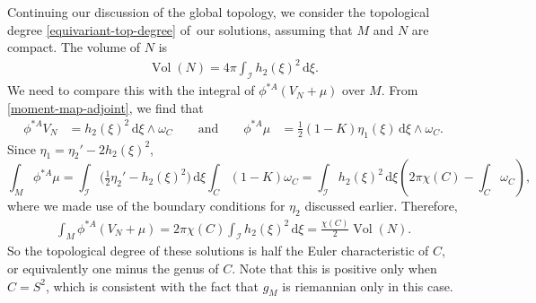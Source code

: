 \documentclass[pdftex]{sigma}
\newcommand{\II}{{\mathcal{I}}}
\newcommand{\1}{{\mathbb{1}}}
\def \d{\mathrm{d}}
\numberwithin{equation}{section}
\begin{document}
Continuing our discussion of the global topology, we consider the topological degree \eqref{equivariant-top-degree} of~our solutions, assuming that $M$ and $N$ are compact. The volume of $N$ is
\begin{align*}
\operatorname{Vol}(N)=4\pi\int_\II h_2(\xi)^2\,\d\xi.
\end{align*}
We need to compare this with the integral of $\phi^{\ast A}(V_N+\mu)$ over $M$. From \eqref{moment-map-adjoint}, we find that
\begin{equation*}
\begin{aligned}
\phi^{\ast A}V_N &= h_2(\xi)^2\,\d\xi\wedge\omega_C \qquad\text{and}\qquad
\phi^{\ast A}\mu &= \tfrac{1}{2}(1-K)\eta_1(\xi)\,\d\xi\wedge\omega_C.
\end{aligned}
\end{equation*}
Since $\eta_1=\eta_2'-2h_2(\xi)^2$,
\begin{equation*}
\int_M \phi^{\ast A}\mu = \int_\II \bigl(\tfrac12\eta_2'-h_2(\xi)^2\bigr)\,\d\xi\int_C(1-K)\omega_C= \int_\II h_2(\xi)^2 \,\d\xi\left(2\pi\chi(C)-\int_C\omega_C\right),
\end{equation*}
where we made use of the boundary conditions for $\eta_2$ discussed earlier. Therefore,
\begin{align*}
\int_M \phi^{\ast A}(V_N+\mu) = 2\pi\chi(C)\int_\II h_2(\xi)^2\,\d\xi = \frac{\chi(C)}{2}\operatorname{Vol}(N).
\end{align*}
So the topological degree of these solutions is half the Euler characteristic of $C$, or equivalently one minus the genus of $C$. Note that this is positive only when $C=S^2$, which is consistent with the fact that $g_M$ is riemannian only in this case.
\end{document}
